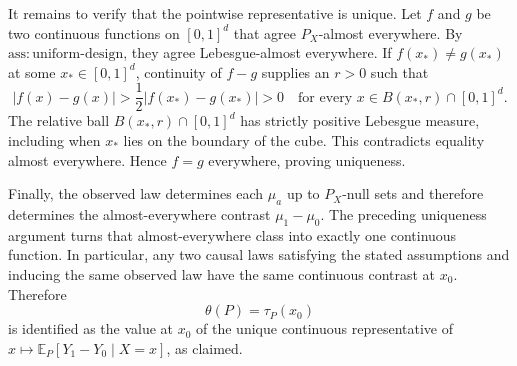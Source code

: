 It remains to verify that the pointwise representative is unique. Let \(f\) and \(g\) be two continuous functions on \([0,1]^d\) that agree \(P_X\)-almost everywhere. By \(\mathrm{ass{:}uniform\mbox{-}design}\), they agree Lebesgue-almost everywhere. If \(f(x_*)\ne g(x_*)\) at some \(x_*\in[0,1]^d\), continuity of \(f-g\) supplies an \(r>0\) such that
\[
|f(x)-g(x)|>\frac12|f(x_*)-g(x_*)|>0
\quad\text{for every }x\in B(x_*,r)\cap[0,1]^d.
\]
The relative ball \(B(x_*,r)\cap[0,1]^d\) has strictly positive Lebesgue measure, including when \(x_*\) lies on the boundary of the cube. This contradicts equality almost everywhere. Hence \(f=g\) everywhere, proving uniqueness.

Finally, the observed law determines each \(\mu_a\) up to \(P_X\)-null sets and therefore determines the almost-everywhere contrast \(\mu_1-\mu_0\). The preceding uniqueness argument turns that almost-everywhere class into exactly one continuous function. In particular, any two causal laws satisfying the stated assumptions and inducing the same observed law have the same continuous contrast at \(x_0\). Therefore
\[
\theta(P)=\tau_P(x_0)
\]
is identified as the value at \(x_0\) of the unique continuous representative of \(x\mapsto\mathbb E_P[Y_1-Y_0\mid X=x]\), as claimed.

